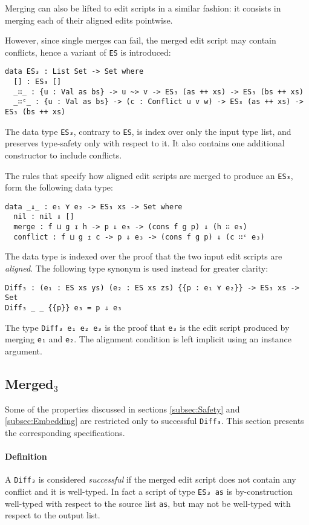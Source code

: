 \documentclass[../Thesis.tex]{subfiles}
\begin{document}
	Merging can also be lifted to edit scripts in a similar fashion: it
	consists in merging each of their aligned edits pointwise.
	
	However, since single merges can fail, the merged edit
	script may contain conflicts, hence a variant of \texttt{ES} 
	is introduced:
	\begin{verbatim}
data ES₃ : List Set -> Set where
  [] : ES₃ []
  _∷_ : {u : Val as bs} -> u ~> v -> ES₃ (as ++ xs) -> ES₃ (bs ++ xs)
  _∷ᶜ_ : {u : Val as bs} -> (c : Conflict u v w) -> ES₃ (as ++ xs) -> ES₃ (bs ++ xs)
	\end{verbatim}
	
	The data type \texttt{ES₃}, contrary to \texttt{ES}, is index over only 
	the input type list, and preserves type-safety only with respect to it.
	It also contains one additional constructor to include conflicts.
	
	The rules that specify how aligned edit scripts are merged to produce
	an \texttt{ES₃}, form the following data type:
	
\begin{verbatim}
data _⇓_ : e₁ ⋎ e₂ -> ES₃ xs -> Set where
  nil : nil ⇓ []
  merge : f ⊔ g ↧ h -> p ⇓ e₃ -> (cons f g p) ⇓ (h ∷ e₃)
  conflict : f ⊔ g ↥ c -> p ⇓ e₃ -> (cons f g p) ⇓ (c ∷ᶜ e₃)
\end{verbatim}

	The data type is indexed over the proof that the two input edit scripts are
	\emph{aligned}.
	The following type synonym is used instead for greater clarity:
\begin{verbatim}
Diff₃ : (e₁ : ES xs ys) (e₂ : ES xs zs) {{p : e₁ ⋎ e₂}} -> ES₃ xs -> Set
Diff₃ _ _ {{p}} e₃ = p ⇓ e₃
\end{verbatim}
	The type \texttt{Diff₃ e₁ e₂ e₃} is the proof that \texttt{e₃} is the edit script
	produced by merging \texttt{e₁} and \texttt{e₂}. The alignment condition is 
	left implicit using	 an instance argument.	
	
	\subsection{Merged$_3$}
	\label{subsec:Merged3}
	Some of the properties discussed in sections \ref{subsec:Safety} and
	\ref{subsec:Embedding} are restricted only to successful \texttt{Diff₃}.
	This section presents the corresponding specifications.

	\paragraph{Definition}
	A \texttt{Diff₃} is considered \emph{successful} if the merged edit script
	does not contain any conflict and it is well-typed.
	In fact a script of type \texttt{ES₃ as} is by-construction 
	well-typed with respect to the source list \texttt{as}, 
	but may not be well-typed with respect to the output list.
	
\end{document}
